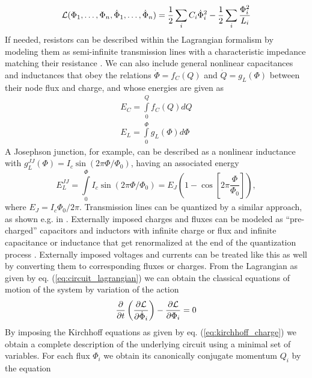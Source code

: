 %
\begin{equation}
\begin{mathcal}L\end{mathcal}(\Phi_1,\hdots,\Phi_n,\dot{\Phi}_1,\hdots,\dot{\Phi}_n) = \frac{1}{2}\sum\limits_i C_i \dot{\Phi}_i^2-\frac{1}{2}\sum\limits_i \frac{\Phi_i^2}{L_i} \label{eq:circuit_lagrangian}
\end{equation}
%
If needed, resistors can be described within the Lagrangian formalism by modeling them as semi-infinite transmission lines with a characteristic impedance matching their resistance \citep{yurke_quantum_1984}. We can also include general nonlinear capacitances and inductances that obey the relations $\dot{\Phi}=f_C(Q)$ and $\dot{Q}=g_L(\Phi)$ between their node flux and charge, and whose energies are given as
%
\begin{eqnarray}
E_C = \int\limits_0^Q f_C(Q)dQ \\
E_L = \int\limits_0^\Phi g_L(\Phi)d\Phi
\end{eqnarray}
%
A Josephson junction, for example, can be described as a nonlinear inductance with $g_L^{JJ}(\Phi)=I_c\sin{(2\pi\Phi/\Phi_0)}$, having an associated energy
%
\begin{equation}
E_L^{JJ} = \int\limits_0^\Phi I_c\sin{\left(2\pi\Phi/\Phi_0\right)}=E_J(1-\cos{\left[2\pi\frac{\Phi}{\Phi_0}\right]}),
\end{equation}
%
where $E_J = I_c\Phi_0/2\pi$. Transmission lines can be quantized by a similar approach, as shown e.g. in \citep{yurke_quantum_1984}. Externally imposed charges and fluxes can be modeled as ``pre-charged'' capacitors and inductors with infinite charge or flux and infinite capacitance or inductance that get renormalized at the end of the quantization process \citep{devoret_quantum_1995}. Externally imposed voltages and currents can be treated like this as well by converting them to corresponding fluxes or charges. From the Lagrangian as given by eq. (\ref{eq:circuit_lagrangian}) we can obtain the classical equations of motion of the system by variation of the action
%
\begin{equation}
\frac{\partial}{\partial t}\left( \frac{\partial \begin{mathcal}L\end{mathcal}}{\partial\dot{\Phi}_i}\right)-\frac{\partial \begin{mathcal}L\end{mathcal}}{\partial \Phi_i} = 0
\end{equation}
%
By imposing the Kirchhoff equations as given by eq. (\ref{eq:kirchhoff_charge}) we obtain a complete description of the underlying circuit using a minimal set of variables. For each flux $\Phi_i$ we obtain its canonically conjugate momentum $Q_i$ by the equation
